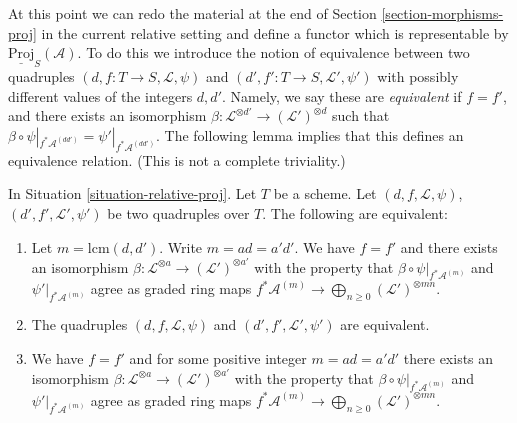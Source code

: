 \noindent
At this point we can redo the material at the end of
Section \ref{section-morphisms-proj} in the current
relative setting and define a functor
which is representable by
$\underline{\text{Proj}}_S(\mathcal{A})$. To do this we introduce the
notion of equivalence between two
quadruples $(d, f : T \to S, \mathcal{L}, \psi)$ and
$(d', f' : T \to S, \mathcal{L}', \psi')$ with possibly different
values of the integers $d, d'$. Namely, we say these
are {\it equivalent} if $f = f'$, and there exists an
isomorphism $\beta : \mathcal{L}^{\otimes d'} \to (\mathcal{L}')^{\otimes d}$
such that
$\beta \circ \psi|_{f^*\mathcal{A}^{(dd')}} = \psi'|_{f^*\mathcal{A}^{(dd')}}$.
The following lemma implies that this defines an equivalence relation.
(This is not a complete triviality.)

\begin{lemma}
\label{lemma-equivalent-relative}
In Situation \ref{situation-relative-proj}.
Let $T$ be a scheme.
Let $(d, f, \mathcal{L}, \psi)$, $(d', f', \mathcal{L}', \psi')$
be two quadruples over $T$. The following are equivalent:
\begin{enumerate}
\item Let $m = \text{lcm}(d, d')$. Write $m = ad = a'd'$.
We have $f = f'$ and there exists
an isomorphism
$\beta : \mathcal{L}^{\otimes a} \to (\mathcal{L}')^{\otimes a'}$
with the property that $\beta \circ \psi|_{f^*\mathcal{A}^{(m)}}$
and $\psi'|_{f^*\mathcal{A}^{(m)}}$ agree
as graded ring maps
$f^*\mathcal{A}^{(m)} \to \bigoplus_{n \geq 0} (\mathcal{L}')^{\otimes mn}$.
\item The quadruples $(d, f, \mathcal{L}, \psi)$ and
$(d', f', \mathcal{L}', \psi')$ are equivalent.
\item We have $f = f'$ and
for some positive integer $m = ad = a'd'$ there exists an isomorphism
$\beta : \mathcal{L}^{\otimes a} \to (\mathcal{L}')^{\otimes a'}$
with the property that $\beta \circ \psi|_{f^*\mathcal{A}^{(m)}}$
and $\psi'|_{f^*\mathcal{A}^{(m)}}$ agree
as graded ring maps
$f^*\mathcal{A}^{(m)} \to \bigoplus_{n \geq 0} (\mathcal{L}')^{\otimes mn}$.
\end{enumerate}
\end{lemma}

